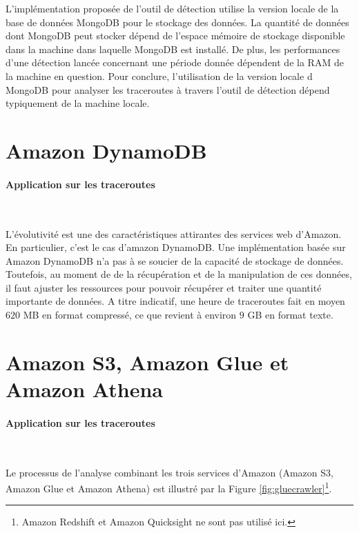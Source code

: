 L'implémentation proposée de l'outil de détection utilise la version locale de la base de données MongoDB pour le stockage des données.  La quantité de données dont MongoDB peut stocker dépend de l'espace mémoire de stockage disponible dans la machine dans laquelle MongoDB est installé. De plus, les performances d'une détection lancée concernant une période donnée dépendent de la RAM de la machine en question. Pour conclure, l'utilisation de la version locale d MongoDB pour analyser les traceroutes à travers l'outil de détection dépend typiquement de la machine locale.


\section{Amazon DynamoDB}


\paragraph{Application sur les traceroutes}~


L'évolutivité est une des caractéristiques attirantes des services web d'Amazon. En particulier, c'est le cas d'amazon DynamoDB. Une implémentation basée sur Amazon DynamoDB  n'a pas à se soucier de la capacité  de stockage de données. Toutefois,  au moment de de la récupération et de la manipulation de ces données, il faut ajuster les ressources pour pouvoir récupérer et traiter une quantité importante de données. A titre indicatif, une heure de traceroutes fait en moyen $620$ MB en format compressé, ce que revient à  environ $9$ GB en format texte.




\section{Amazon S3, Amazon Glue  et Amazon Athena }


\paragraph{Application sur les traceroutes}~

Le processus de l'analyse combinant les trois services d'Amazon (Amazon S3, Amazon Glue  et Amazon Athena) est illustré par la Figure \ref{fig:gluecrawler}\footnote{Amazon Redshift et Amazon Quicksight ne sont pas utilisé ici.}. 

